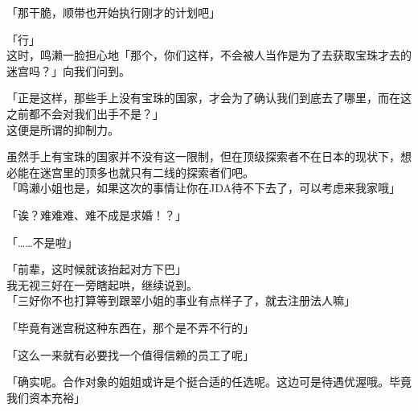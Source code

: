「那干脆，顺带也开始执行刚才的计划吧」

「行」\\

这时，鸣濑一脸担心地「那个，你们这样，不会被人当作是为了去获取宝珠才去的迷宫吗？」向我们问到。

「正是这样，那些手上没有宝珠的国家，才会为了确认我们到底去了哪里，而在这之前都不会对我们出手不是？」\\

这便是所谓的抑制力。

虽然手上有宝珠的国家并不没有这一限制，但在顶级探索者不在日本的现状下，想必能在迷宫里的顶多也就只有二线的探索者们吧。\\

「鸣濑小姐也是，如果这次的事情让你在JDA待不下去了，可以考虑来我家哦」

「诶？难难难、难不成是求婚！？」

「……不是啦」

「前辈，这时候就该抬起对方下巴」\\

我无视三好在一旁瞎起哄，继续说到。\\

「三好你不也打算等到跟翠小姐的事业有点样子了，就去注册法人嘛」

「毕竟有迷宫税这种东西在，那个是不弄不行的」

「这么一来就有必要找一个值得信赖的员工了呢」

「确实呢。合作对象的姐姐或许是个挺合适的任选呢。这边可是待遇优渥哦。毕竟我们资本充裕」

